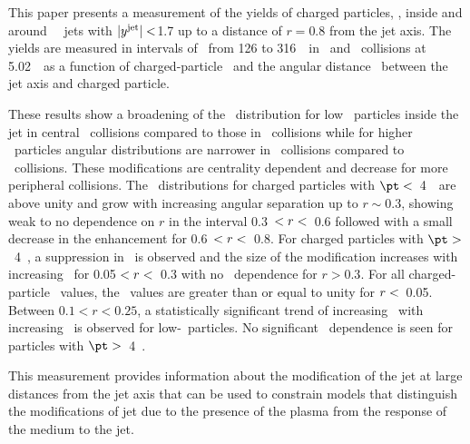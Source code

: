 
This paper presents a measurement of the yields of charged particles, \Dptr, inside and around \RFour\ \antikt\ jets with $|\mbox{$y^{\mathrm{jet}}$}| <$1.7 up to a distance of $r = 0.8$ from the jet axis.
The yields are measured in intervals of \ptjet\ from 126 to 316~\GeV\ in \PbPb\ and \pp\ collisions at 5.02~\TeV\ as a function of charged-particle \pt\ and the angular distance \rvar\ between the jet axis and charged particle.


These results show a broadening of the \Dptr\ distribution for low \pt\ particles inside the jet in central \pbpb\ collisions compared to those in \pp\ collisions while for higher \pt\ particles angular distributions are narrower in \pbpb\ collisions compared to \pp\ collisions.
These modifications are centrality dependent and decrease for more peripheral collisions.
The \RDptr\ distributions for charged particles with $\pt <$~4~\GeV\ are above unity and grow with increasing angular separation up to $r \sim0.3$, showing weak to no dependence on $r$ in the interval 0.3~$< \mbox{$r$} <$~0.6 followed with a small decrease in the enhancement for 0.6~$< \mbox{$r$} <$~0.8.
For charged particles with $\pt >$~4~\GeV, a suppression in \RDptr\ is observed and the size of the modification increases with increasing \rvar\ for 0.05 $ < \mbox{$r$} < $~0.3 with no \rvar\ dependence for $r>0.3$.
For all charged-particle \pt\ values, the \RDptr\ values are greater than or equal to unity for $\mbox{$r$} <$~0.05.
Between $0.1 < r < 0.25$, a statistically significant trend of increasing \RDptr\ with increasing \ptjet\ is observed for low-\pt\ particles.
No significant \ptjet\ dependence is seen for particles  with $\pt >$~4~\GeV.

This measurement provides information about the modification of the jet at large distances from the jet axis that can be used to constrain models that distinguish the modifications of jet due to the presence of the plasma from the response of the medium to the jet.


